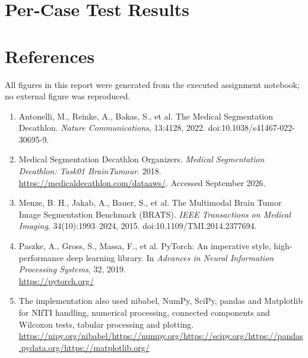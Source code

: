 \documentclass[10pt,a4paper]{article}
\begin{document}
\section*{Per-Case Test Results}


\section*{References}
\scriptsize
\sloppy
All figures in this report were generated from the executed assignment notebook; no external figure was reproduced.
\begin{enumerate}[nosep]
\item Antonelli, M., Reinke, A., Bakas, S., et al. The Medical Segmentation Decathlon. \emph{Nature Communications}, 13:4128, 2022. doi:10.1038/s41467-022-30695-9.
\item Medical Segmentation Decathlon Organizers. \emph{Medical Segmentation Decathlon: Task01 BrainTumour}. 2018.\\
\url{https://medicaldecathlon.com/dataaws/}. Accessed September 2026.
\item Menze, B. H., Jakab, A., Bauer, S., et al. The Multimodal Brain Tumor Image Segmentation Benchmark (BRATS). \emph{IEEE Transactions on Medical Imaging}, 34(10):1993--2024, 2015. doi:10.1109/TMI.2014.2377694.
\item Paszke, A., Gross, S., Massa, F., et al. PyTorch: An imperative style, high-performance deep learning library. In \emph{Advances in Neural Information Processing Systems}, 32, 2019.\\
\url{https://pytorch.org/}
\item The implementation also used nibabel, NumPy, SciPy, pandas and Matplotlib for NIfTI handling, numerical processing, connected components and Wilcoxon tests, tabular processing and plotting.\\
\url{https://nipy.org/nibabel/}\quad\url{https://numpy.org/}\quad\url{https://scipy.org/}\quad\url{https://pandas.pydata.org/}\quad\url{https://matplotlib.org/}
\end{enumerate}
\end{document}
